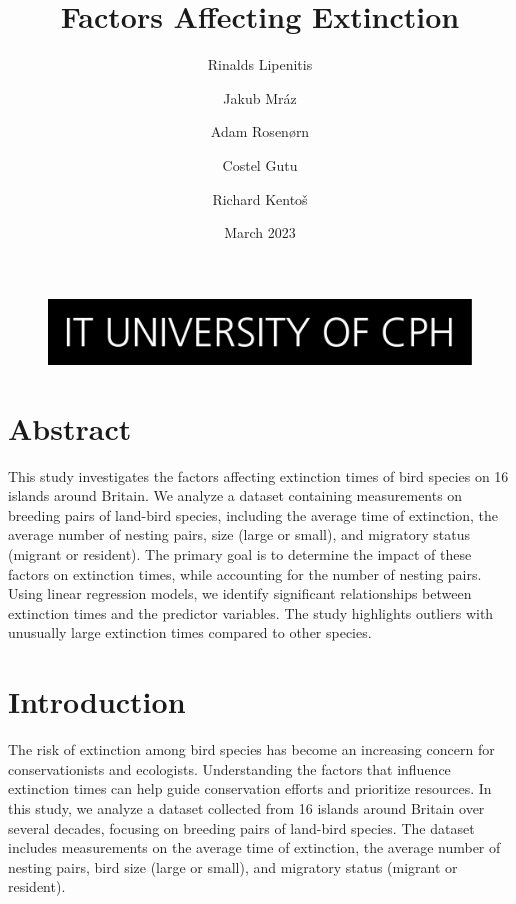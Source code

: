 \documentclass{article}
\begin{document}
\title{Factors Affecting Extinction}

\begin{figure}
    \includegraphics[width=\linewidth]{ITU.jpg}
\end{figure}
\maketitle
\author{Rinalds Lipenitis \and Jakub Mráz \and
Adam Rosenørn \and Costel Gutu \and Richard Kentoš}
\begin{center}
\date{March 2023}
\end{center}

\newpage

\section{Abstract}

This study investigates the factors affecting extinction times of bird species on 16 islands around Britain. We analyze a dataset containing measurements on breeding pairs of land-bird species, including the average time of extinction, the average number of nesting pairs, size (large or small), and migratory status (migrant or resident). The primary goal is to determine the impact of these factors on extinction times, while accounting for the number of nesting pairs. Using linear regression models, we identify significant relationships between extinction times and the predictor variables. The study highlights outliers with unusually large extinction times compared to other species.

\section{Introduction}

The risk of extinction among bird species has become an increasing concern for conservationists and ecologists. Understanding the factors that influence extinction times can help guide conservation efforts and prioritize resources. In this study, we analyze a dataset collected from 16 islands around Britain over several decades, focusing on breeding pairs of land-bird species. The dataset includes measurements on the average time of extinction, the average number of nesting pairs, bird size (large or small), and migratory status (migrant or resident).
\end{document}

